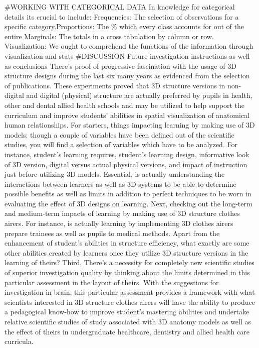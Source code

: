 \documentclass[]{article}
\begin{document}
\#WORKING WITH CATEGORICAL DATA In knowledge for categorical details its
crucial to include: Frequencies: The selection of observations for a
specific category.Proportions: The \% which every class accounts for out
of the entire Marginals: The totals in a cross tabulation by column or
row. Visualization: We ought to comprehend the functions of the
information through visualization and stats \#DISCUSSION Future
investigation instructions as well as conclusions There's proof of
progressive fascination with the usage of 3D structure designs during
the last six many years as evidenced from the selection of publications.
These experiments proved that 3D structure versions in non-digital and
digital (physical) structure are actually preferred by pupils in health,
other and dental allied health schools and may be utilized to help
support the curriculum and improve students' abilities in spatial
visualization of anatomical human relationships. For starters, things
impacting learning by making use of 3D models: though a couple of
variables have been defined out of the scientific studies, you will find
a selection of variables which have to be analyzed. For instance,
student's learning requires, student's learning design, informative look
of 3D version, digital versus actual physical versions, and impact of
instruction just before utilizing 3D models. Essential, is actually
understanding the interactions between learners as well as 3D systems to
be able to determine possible benefits as well as limits in addition to
perfect techniques to be worn in evaluating the effect of 3D designs on
learning. Next, checking out the long-term and medium-term impacts of
learning by making use of 3D structure clothes airers. For instance, is
actually learning by implementing 3D clothes airers prepare trainees as
well as pupils to medical methods. Apart from the enhancement of
student's abilities in structure efficiency, what exactly are some other
abilities created by learners once they utilize 3D structure versions in
the learning of theirs? Third, There's a necessity for completely new
scientific studies of superior investigation quality by thinking about
the limits determined in this particular assessment in the layout of
theirs. With the suggestions for investigation in brain, this particular
assessment provides a framework with what scientists interested in 3D
structure clothes airers will have the ability to produce a pedagogical
know-how to improve student's mastering abilities and undertake relative
scientific studies of study associated with 3D anatomy models as well as
the effect of theirs in undergraduate healthcare, dentistry and allied
health care curricula.
\end{document}
